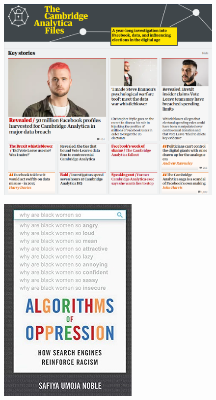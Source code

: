 \begin{frame}
  \begin{figure}
    \includegraphics[width=\columnwidth]{fig/analytica.png}
  \end{figure}
\end{frame}

\begin{frame}
  \begin{figure}
    \includegraphics[height=0.8\textheight]{fig/Algorithms-of-Oppression.jpg}
  \end{figure}
\end{frame}

